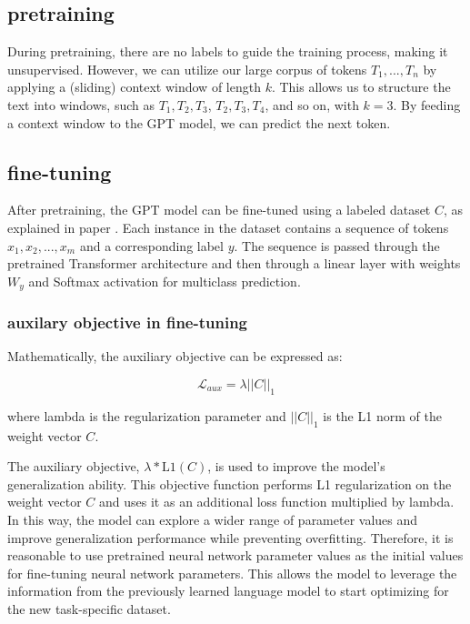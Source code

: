 \documentclass[
	11pt,
	a4paper,
	figtabcapt,
]{oblivoir}
\begin{document}
\subsection{pretraining}
During pretraining, there are no labels to guide the training process, making it unsupervised.
However, we can utilize our large corpus of tokens $T_1, ..., T_n$ by applying a (sliding) context window of length $k$.
This allows us to structure the text into windows, such as $T_1, T_2, T_3$, $T_2, T_3, T_4$, and so on, with $k=3$.
By feeding a context window to the GPT model, we can predict the next token.


\subsection{fine-tuning}
After pretraining, the GPT model can be fine-tuned using a labeled dataset $C$,
as explained in paper \cite{radford2018improving}.
Each instance in the dataset contains a sequence of tokens $x_1, x_2, ..., x_m$ and a corresponding label $y$.
The sequence is passed through the pretrained Transformer architecture
and then through a linear layer with weights $W_y$ and Softmax activation for multiclass prediction.

\subsubsection{auxilary objective in fine-tuning}
Mathematically, the auxiliary objective can be expressed as:

\begin{equation}
\mathcal{L}_{aux} = \lambda ||C||_1
\end{equation}

where lambda is the regularization parameter and $||C||_1$ is the L1 norm of the weight vector $C$.

The auxiliary objective, $\lambda * \text{L1}(C)$, is used to improve the model's generalization ability.
This objective function performs L1 regularization on the weight vector $C$
and uses it as an additional loss function multiplied by lambda.
In this way, the model can explore a wider range of parameter values
and improve generalization performance while preventing overfitting.
Therefore, it is reasonable to use pretrained neural network parameter values
as the initial values for fine-tuning neural network parameters.
This allows the model to leverage the information from the previously learned language model
to start optimizing for the new task-specific dataset. 


\clearpage
\end{document}
